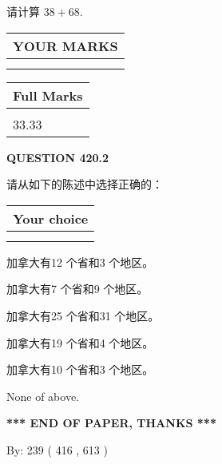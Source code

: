 \documentclass{ctexart}
\begin{document}
  
 
请计算 $ %
38 +  %
68 $.
 

 

 
  
\vspace{0.2in}
  
\noindent\begin{tabular}{|l|}
\hline
 YOUR MARKS  \\
\hline
 \\ 
 \\ 
\hline
\end{tabular}
\hspace{0.05in} \begin{tabular}{|l|}
\hline
 Full Marks  \\
\hline
 \\ 
33.33 \\
\hline
\end{tabular}
{\textbf{\Large{QUESTION
420.2 
}}}
  
  
请从如下的陈述中选择正确的：
  
  
\noindent\hspace{3.0in} \begin{tabular}{|l|}
\hline
Your choice \\
\hline
 \\ 
 \\ 
\hline
\end{tabular}
  
  
 
 
加拿大有12 个省和3 个地区。
 
 
加拿大有7 个省和9 个地区。
 
 
加拿大有25 个省和31 个地区。
 
 
加拿大有19 个省和4 个地区。
 
 
加拿大有10 个省和3 个地区。
 
 
 None of above.
 
 
   
   
 \vspace{0.2in}
 
   
   
   
   
\vspace{1.0in} 
{\textbf{\large{ *** END OF PAPER, THANKS *** }}} 
   
   
\hspace{1.0in} By: 
 239 ( 416 ,  613 )
   
\end{document}
